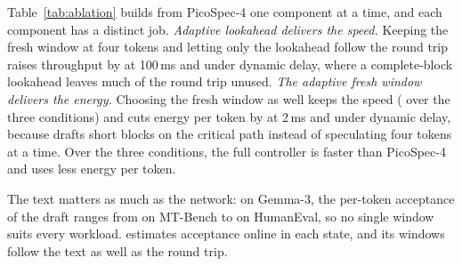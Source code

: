 Table~\ref{tab:ablation} builds \capes{} from PicoSpec-4 one component at a time, and each component has a distinct job. \emph{Adaptive lookahead delivers the speed.} Keeping the fresh window at four tokens and letting only the lookahead follow the round trip raises throughput by   at 100\,ms and   under dynamic delay, where a complete-block lookahead leaves much of the round trip unused. \emph{The adaptive fresh window delivers the energy.} Choosing the fresh window as well keeps the speed ( over the three conditions) and cuts energy per token by   at 2\,ms and   under dynamic delay, because \cape{} drafts short blocks on the critical path instead of speculating four tokens at a time. Over the three conditions, the full controller is   faster than PicoSpec-4 and uses   less energy per token.

The text matters as much as the network: on Gemma-3, the per-token acceptance of the draft ranges from  on MT-Bench to  on HumanEval, so no single window suits every workload. \cape{} estimates acceptance online in each state, and its windows follow the text as well as the round trip.
